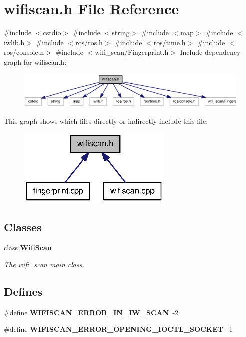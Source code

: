 \section{wifiscan.\-h \-File \-Reference}
\label{wifiscan_8h}
{\ttfamily \#include $<$cstdio$>$}\*
{\ttfamily \#include $<$string$>$}\*
{\ttfamily \#include $<$map$>$}\*
{\ttfamily \#include $<$iwlib.\-h$>$}\*
{\ttfamily \#include $<$ros/ros.\-h$>$}\*
{\ttfamily \#include $<$ros/time.\-h$>$}\*
{\ttfamily \#include $<$ros/console.\-h$>$}\*
{\ttfamily \#include $<$wifi\-\_\-scan/\-Fingerprint.\-h$>$}\*
\-Include dependency graph for wifiscan.\-h\-:\nopagebreak
\begin{figure}[H]
\begin{center}
\leavevmode
\includegraphics[width=350pt]{wifiscan_8h__incl}
\end{center}
\end{figure}
\-This graph shows which files directly or indirectly include this file\-:\nopagebreak
\begin{figure}[H]
\begin{center}
\leavevmode
\includegraphics[width=210pt]{wifiscan_8h__dep__incl}
\end{center}
\end{figure}
\subsection*{\-Classes}
\begin{DoxyCompactItemize}
\item 
class {\bf \-Wifi\-Scan}
\begin{DoxyCompactList}\small\item\em \-The wifi\-\_\-scan main class. \end{DoxyCompactList}\end{DoxyCompactItemize}
\subsection*{\-Defines}
\begin{DoxyCompactItemize}
\item 
\#define {\bf \-W\-I\-F\-I\-S\-C\-A\-N\-\_\-\-E\-R\-R\-O\-R\-\_\-\-I\-N\-\_\-\-I\-W\-\_\-\-S\-C\-A\-N}~-\/2
\item 
\#define {\bf \-W\-I\-F\-I\-S\-C\-A\-N\-\_\-\-E\-R\-R\-O\-R\-\_\-\-O\-P\-E\-N\-I\-N\-G\-\_\-\-I\-O\-C\-T\-L\-\_\-\-S\-O\-C\-K\-E\-T}~-\/1
\end{DoxyCompactItemize}


